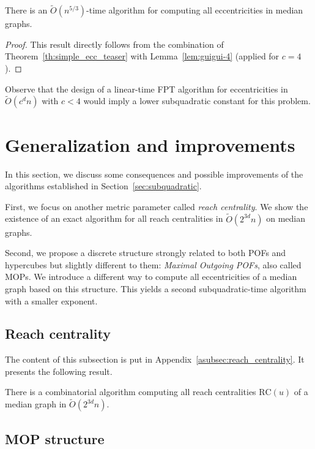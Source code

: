 \documentclass[a4paper,UKenglish,numberwithinsect,cleveref, autoref,anonymous]{lipics-v2021}
\newcommand{\rc}{\mbox{RC}}
\begin{document}
\begin{theorem}\label{thm:guigui-5}
There is an $\tilde{O}(n^{5/3})$-time algorithm for computing all eccentricities in median graphs.
\end{theorem}
\begin{proof}
This result directly follows from the combination of Theorem~\ref{th:simple_ecc_teaser} with Lemma~\ref{lem:guigui-4} (applied for $c = 4$).
\end{proof}

Observe that the design of a linear-time FPT algorithm for eccentricities in $\tilde{O}(c^dn)$ with $c < 4$ would imply a lower subquadratic constant for this problem.

\section{Generalization and improvements} \label{sec:discussion}

In this section, we discuss some consequences and possible improvements of the algorithms established in Section~\ref{sec:subquadratic}. 

First, we focus on another metric parameter called \textit{reach centrality}. We show the existence of an exact algorithm for all reach centralities in $\tilde{O}(2^{3d}n)$ on median graphs.  

Second, we propose a discrete structure strongly related to both POFs and hypercubes but slightly different to them: \textit{Maximal Outgoing POFs}, also called MOPs. We introduce a different way to compute all eccentricities of a median graph based on this structure. This yields a second subquadratic-time algorithm with a smaller exponent.

\subsection{Reach centrality} \label{subsec:reach_centrality}

The content of this subsection is put in Appendix~\ref{asubsec:reach_centrality}. It presents the following result.

\begin{theorem}[\ref{th:simple_rc}]
There is a combinatorial algorithm computing all  reach centralities $\rc(u)$ of a median graph in $\tilde{O}(2^{3d}n)$.
\label{th:simple_rc_teaser}
\end{theorem}

\subsection{MOP structure} \label{subsec:mop}
\end{document}
